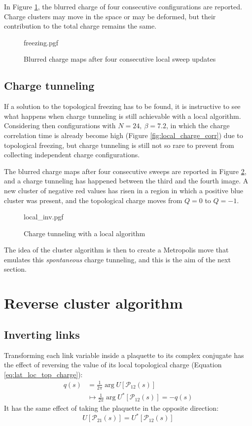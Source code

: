 In Figure \ref{fig:freezing}, the blurred charge of four consecutive configurations are reported.
Charge clusters may move in the space or may be deformed,
but their contribution to the total charge remains the same.

\begin{figure}[!htb]
    \centering
    {freezing.pgf}
    \caption{Blurred charge maps after four consecutive local sweep updates}
    \label{fig:freezing}
\end{figure}

\subsection*{Charge tunneling}
If a solution to the topological freezing has to be found,
it is instructive to see what happens when charge tunneling is still achievable with a local algorithm.
Considering then configurations with $N=24,\ \beta=7.2$,
in which the charge correlation time is already become high (Figure \ref{fig:local_charge_corr}) due to topological freezing,
but charge tunneling is still not so rare to prevent from collecting independent charge configurations.

The blurred charge maps after four consecutive sweeps are reported in Figure \ref{fig:local_inv},
and a charge tunneling has happened between the third and the fourth image.
A new cluster of negative red values has risen in a region in which a positive blue cluster was present,
and the topological charge moves from $Q=0$ to $Q=-1$.

\begin{figure}[!htb]
    \centering
    {local_inv.pgf}
    \caption{Charge tunneling with a local algorithm}
    \label{fig:local_inv}
\end{figure}

The idea of the cluster algorithm is then to create a Metropolis move that emulates this \emph{spontaneous} charge tunneling,
and this is the aim of the next section.

\section{Reverse cluster algorithm}

\subsection*{Inverting links}

Transforming each link variable inside a plaquette to its complex conjugate
has the effect of reversing the value of its local topological charge (Equation \eqref{eq:lat_loc_top_charge}):
\[\begin{aligned}
    q(s) &= \frac{1}{2\pi}\arg U[\mathcal P_{12}(s)] \\
         &\mapsto \frac{1}{2\pi}\arg U^*[\mathcal P_{12}(s)] = -q(s)
\end{aligned}\]
It has the same effect of taking the plaquette in the opposite direction:
\[
    U[\mathcal P_{21}(s)] = U^*[\mathcal P_{12}(s)]
\]

